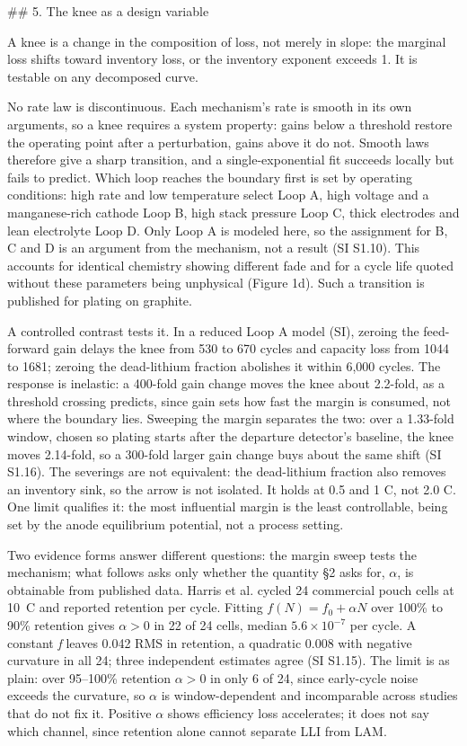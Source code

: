 ## 5. The knee as a design variable

A knee is a change in the composition of loss, not merely in slope: the marginal loss shifts toward inventory loss, or the inventory exponent exceeds 1. It is testable on any decomposed curve.

No rate law is discontinuous. Each mechanism's rate is smooth in its own arguments, so a knee requires a system property: gains below a threshold restore the operating point after a perturbation, gains above it do not. Smooth laws therefore give a sharp transition, and a single-exponential fit succeeds locally but fails to predict. Which loop reaches the boundary first is set by operating conditions: high rate and low temperature select Loop A, high voltage and a manganese-rich cathode Loop B, high stack pressure Loop C, thick electrodes and lean electrolyte Loop D. Only Loop A is modeled here, so the assignment for B, C and D is an argument from the mechanism, not a result (SI S1.10). This accounts for identical chemistry showing different fade and for a cycle life quoted without these parameters being unphysical (Figure 1d). Such a transition is published for plating on graphite.\cite{klein2024identifying}

A controlled contrast tests it. In a reduced Loop A model (SI), zeroing the feed-forward gain delays the knee from 530 to 670 cycles and capacity loss from 1044 to 1681; zeroing the dead-lithium fraction abolishes it within 6,000 cycles. The response is inelastic: a 400-fold gain change moves the knee about 2.2-fold, as a threshold crossing predicts, since gain sets how fast the margin is consumed, not where the boundary lies. Sweeping the margin separates the two: over a 1.33-fold window, chosen so plating starts after the departure detector's baseline, the knee moves 2.14-fold, so a 300-fold larger gain change buys about the same shift (SI S1.16). The severings are not equivalent: the dead-lithium fraction also removes an inventory sink, so the arrow is not isolated. It holds at 0.5 and 1 C, not 2.0 C. One limit qualifies it: the most influential margin is the least controllable, being set by the anode equilibrium potential, not a process setting.

Two evidence forms answer different questions: the margin sweep tests the mechanism; what follows asks only whether the quantity \S2 asks for, $\alpha$, is obtainable from published data. Harris et al. cycled 24 commercial pouch cells at 10 C and reported retention per cycle.\cite{harris2017failure} Fitting $f(N) = f_0 + \alpha N$ over 100\% to 90\% retention gives $\alpha > 0$ in 22 of 24 cells, median $5.6\times10^{-7}$ per cycle. A constant \emph{f} leaves 0.042 RMS in retention, a quadratic 0.008 with negative curvature in all 24; three independent estimates agree (SI S1.15). The limit is as plain: over 95--100\% retention $\alpha > 0$ in only 6 of 24, since early-cycle noise exceeds the curvature, so $\alpha$ is window-dependent and incomparable across studies that do not fix it. Positive $\alpha$ shows efficiency loss accelerates; it does not say which channel, since retention alone cannot separate LLI from LAM.

